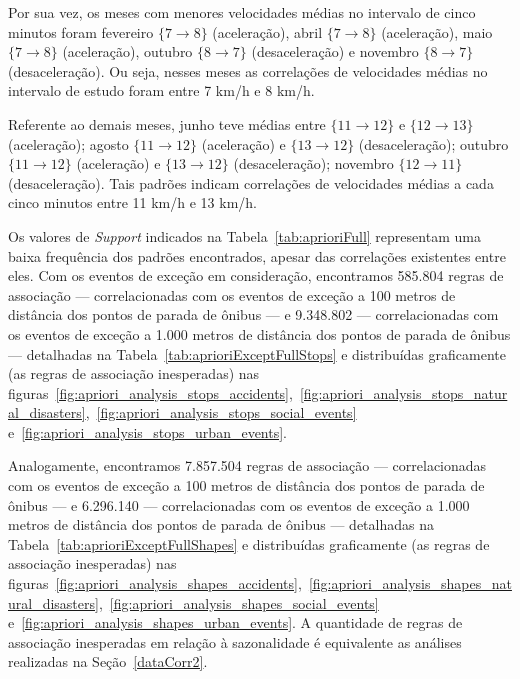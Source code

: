 \documentclass[
	12pt,				%
	oneside,			%
	a4paper,			%
	english,			%
	brazil				%
	]{abntex2ppgsi}
\begin{document}
{{Por sua vez, os meses com menores velocidades médias no intervalo de cinco minutos foram fevereiro $\lbrace 7 \rightarrow 8\rbrace$ (aceleração), abril $\lbrace 7 \rightarrow 8 \rbrace$ (aceleração), maio $\lbrace7 \rightarrow 8\rbrace$ (aceleração), outubro $\lbrace8 \rightarrow 7\rbrace$ (desaceleração) e novembro $\lbrace8 \rightarrow 7\rbrace$ (desaceleração). Ou seja, nesses meses as correlações de velocidades médias no intervalo de estudo foram entre 7 km/h e 8 km/h.

Referente ao demais meses, junho teve médias entre $\lbrace11 \rightarrow 12\rbrace$ e $\lbrace12 \rightarrow 13\rbrace$ (aceleração); agosto $\lbrace11 \rightarrow 12\rbrace$ (aceleração) e $\lbrace13 \rightarrow 12\rbrace$  (desaceleração); outubro $\lbrace11 \rightarrow 12\rbrace$ (aceleração) e $\lbrace13 \rightarrow 12\rbrace$ (desaceleração); novembro $\lbrace12 \rightarrow 11\rbrace$ (desaceleração). Tais padrões indicam correlações de velocidades médias a cada cinco minutos entre 11 km/h e 13 km/h.

Os valores de \textit{Support} indicados na Tabela~\ref{tab:aprioriFull} representam uma baixa frequência dos padrões encontrados, apesar das correlações existentes entre eles. Com os eventos de exceção em consideração, encontramos 585.804 regras de associação --- correlacionadas com os eventos de exceção a 100 metros de distância dos pontos de parada de ônibus --- e 9.348.802 --- correlacionadas com os eventos de exceção a 1.000 metros de distância dos pontos de parada de ônibus --- detalhadas na Tabela~\ref{tab:aprioriExceptFullStops} e distribuídas graficamente (as regras de associação inesperadas) nas figuras~\ref{fig:apriori_analysis_stops_accidents},~\ref{fig:apriori_analysis_stops_natural_disasters},~\ref{fig:apriori_analysis_stops_social_events} e~\ref{fig:apriori_analysis_stops_urban_events}. 

Analogamente, encontramos 7.857.504 regras de associação --- correlacionadas com os eventos de exceção a 100 metros de distância dos pontos de parada de ônibus --- e 6.296.140 --- correlacionadas com os eventos de exceção a 1.000 metros de distância dos pontos de parada de ônibus --- detalhadas na Tabela~\ref{tab:aprioriExceptFullShapes} e distribuídas graficamente (as regras de associação inesperadas)  nas figuras~\ref{fig:apriori_analysis_shapes_accidents},~\ref{fig:apriori_analysis_shapes_natural_disasters},~\ref{fig:apriori_analysis_shapes_social_events} e~\ref{fig:apriori_analysis_shapes_urban_events}. A quantidade de regras de associação inesperadas em relação à sazonalidade é equivalente as análises realizadas na Seção~\ref{dataCorr2}.

}}
\end{document}
